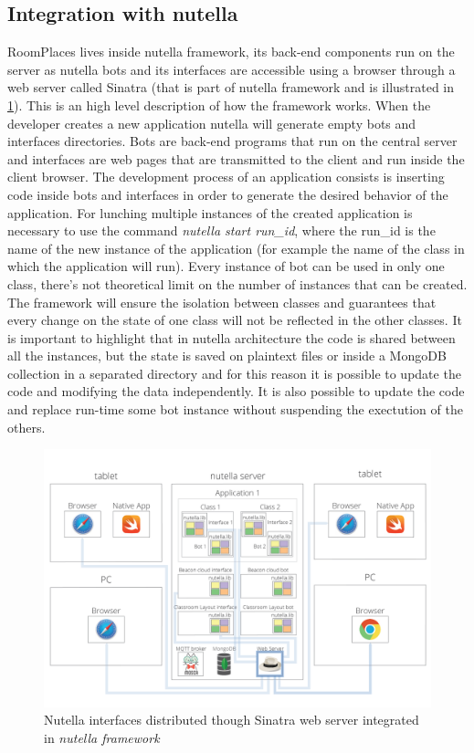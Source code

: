 \subsection{Integration with nutella}
RoomPlaces lives inside nutella framework, its back-end components run on the server as nutella bots and its interfaces are accessible using a browser through a web server called Sinatra (that is part of nutella framework and is illustrated in \ref{fig:nutella_web_server}). This is an high level description of how the framework works. When the developer creates a new application nutella will generate empty bots and interfaces directories. Bots are back-end programs that run on the central server and interfaces are web pages that are transmitted to the client and run inside the client browser. The development  process of an application consists is inserting code inside bots and interfaces in order to generate the desired behavior of the application. For lunching multiple instances of the created application is necessary to use the command \textit{nutella start run\_id}, where the run\_id is the name of the new instance of the application (for example the name of the class in which the application will run). Every instance of bot can be used in only one class, there's not theoretical limit on the number of instances that can be created. The framework will ensure the isolation between classes and guarantees that every change on the state of one class will not be reflected in the other classes. It is important to highlight that in nutella architecture the code is shared between all the instances, but the state is saved on plaintext files or inside a MongoDB collection in a separated directory and for this reason it is possible to update the code and modifying the data independently. It is also possible to update the code and replace run-time some bot instance without suspending the exectution of the others.

\begin{figure}
\centering
\includegraphics[width=6in]{images/nutella-client-server-webserver.png}
\caption{Nutella interfaces distributed though Sinatra web server integrated in \textit{nutella framework}}
\label{fig:nutella_web_server}
\end{figure}


